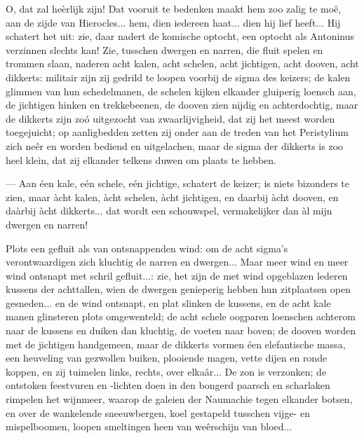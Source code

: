 \documentclass[a4paper, 12pt, oneside, dutch]{article}
\begin{document}
O, dat zal heèrlijk zijn! Dat vooruit te bedenken maakt hem zoo zalig te moê, aan de zijde van Hierocles... hem, dien iedereen haat... dien hij lief heeft... Hij schatert het uit: zie, daar nadert de komische optocht, een optocht als Antoninus verzinnen slechts kan! Zie, tusschen dwergen en narren, die fluit spelen en trommen slaan, naderen acht kalen, acht schelen, acht jichtigen, acht dooven, acht dikkerts: militair zijn zij gedrild te loopen voorbij de sigma des keizers; de kalen glimmen van hun schedelmanen, de schelen kijken elkander gluiperig loensch aan, de jichtigen hinken en trekkebeenen, de dooven zien nijdig en achterdochtig, maar de dikkerts zijn zoó uitgezocht van zwaarlijvigheid, dat zij het meest worden toegejuicht; op aanligbedden zetten zij onder aan de treden van het Peristylium zich neêr en worden bediend en uitgelachen, maar de sigma der dikkerts is zoo heel klein, dat zij elkander telkens duwen om plaats te hebben.

--- Aan éen kale, eén schele, eén jichtige, schatert de keizer; is niets bizonders te zien, maar àcht kalen, àcht schelen, àcht jichtigen, en daarbij àcht dooven, en daàrbij àcht dikkerts... dat wordt een schouwspel, vermakelijker dan àl mijn dwergen en narren!

Plots een gefluit als van ontsnappenden wind: om de acht sigma's verontwaardigen zich kluchtig de narren en dwergen... Maar meer wind en meer wind ontsnapt met schril gefluit...: zie, het zijn de met wind opgeblazen lederen kussens der achttallen, wien de dwergen genieperig hebben hun zitplaatsen open gesneden... en de wind ontsnapt, en plat slinken de kussens, en de acht kale manen glinsteren plots omgewenteld; de acht schele oogparen loenschen achterom naar de kussens en duiken dan kluchtig, de voeten naar boven; de dooven worden met de jichtigen handgemeen, maar de dikkerts vormen éen elefantische massa, een heuveling van gezwollen buiken, plooiende magen, vette dijen en ronde koppen, en zij tuimelen links, rechts, over elkaâr... De zon is verzonken; de ontstoken feestvuren en -lichten doen in den bongerd paarsch en scharlaken rimpelen het wijnmeer, waarop de galeien der Naumachie tegen elkander botsen, en over de wankelende sneeuwbergen, koel gestapeld tusschen vijge- en mispelboomen, loopen smeltingen heen van weêrschijn van bloed...
\end{document}
